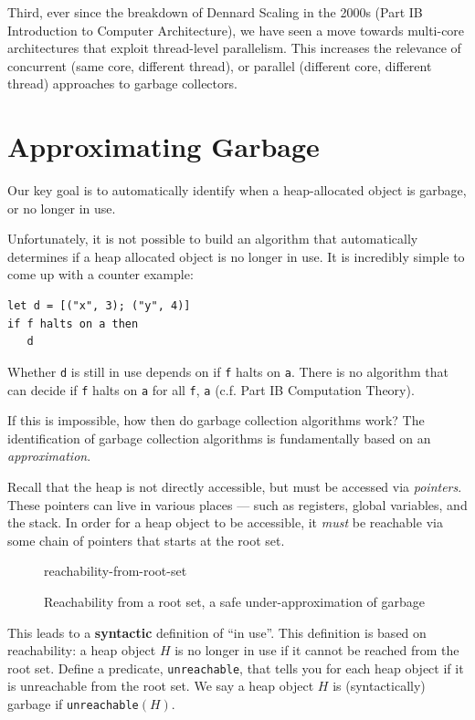 Third, ever since the breakdown of Dennard Scaling in the 2000s (\textsf{Part IB Introduction to Computer Architecture}), we have seen a move towards multi-core architectures that exploit thread-level parallelism. This increases the relevance of concurrent (same core, different thread), or parallel (different core, different thread) approaches to garbage collectors. 


\section{Approximating Garbage}
Our key goal is to automatically identify when a heap-allocated object is garbage, or no longer in use.

Unfortunately, it is not possible to build an algorithm that automatically determines if a heap allocated object is no longer in use. It is incredibly simple to come up with a counter example:

\begin{verbatim}
let d = [("x", 3); ("y", 4)]
if f halts on a then
   d
\end{verbatim}
Whether \texttt{d} is still in use depends on if \texttt{f} halts on \texttt{a}. There is no algorithm that can decide if \texttt{f} halts on \texttt{a} for all \texttt{f}, \texttt{a} (c.f. \textsf{Part IB Computation Theory}).

If this is impossible, how then do garbage collection algorithms work? The identification of garbage collection algorithms is fundamentally based on an \textit{approximation}. 

Recall that the heap is not directly accessible, but must be accessed via \textit{pointers}. These pointers can live in various places --- such as registers, global variables, and the stack. In order for a heap object to be accessible, it \textit{must} be reachable via some chain of pointers that starts at the root set.  

\begin{figure}
    \centering
    {reachability-from-root-set}
    \caption{Reachability from a root set, a safe under-approximation of garbage}
    \label{fig:reachability-from-root-set}
\end{figure}

This leads to a \textbf{syntactic} definition of ``in use''. This definition is based on reachability: a heap object $H$ is no longer in use if it cannot be reached from the root set. Define a predicate, \texttt{unreachable}, that tells you for each heap object if it is unreachable from the root set. We say a heap object $H$ is (syntactically) garbage if \texttt{unreachable}$(H)$.

